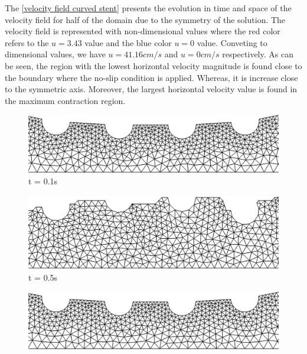 \newpage
The \ref{velocity field curved stent} presents the evolution in 
time and space of the velocity field for half of the domain
due to the symmetry of the solution. 
The velocity field is represented with non-dimensional values 
where the red color refers to the $u=3.43$ value and the blue color 
$u=0$ value. Conveting to dimensional values, 
we have $u=41.16cm/s$ and $u=0cm/s$ respectively.
As can be seen, the region with the lowest horizontal velocity 
magnitude is found close to the boundary where the no-slip
condition is applied. Whereas, it is increase close to 
the symmetric axis. Moreover, the largest horizontal velocity value
is found in the maximum contraction region.


\vspace{2cm} 
\begin{figure}[H]
     \begin{minipage}{.50\linewidth}
      \centering
      \includegraphics[scale=0.2]{./02_chaps/cap_solution/figure/alecurved1.png}\\
      t = 0.1s
     \end{minipage}%
     \begin{minipage}{.50\linewidth}
      \centering
      \includegraphics[scale=0.2]{./02_chaps/cap_solution/figure/alereal1.png}\\
      t = 0.5s
     \end{minipage}
     \begin{minipage}{.50\linewidth}
     \medskip
      \centering
      \includegraphics[scale=0.2]{./02_chaps/cap_solution/figure/alecurved2.png}\\

\end{minipage}
\end{figure}
